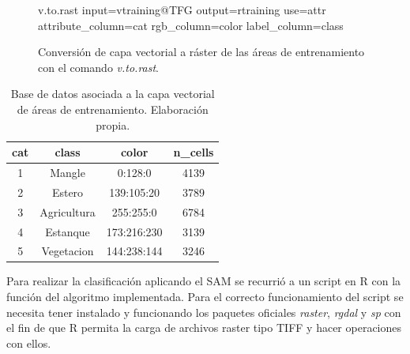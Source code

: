 \begin{figure}
	\centering
	\begin{boxedverbatim}
	v.to.rast input=vtraining@TFG output=rtraining
	use=attr attribute_column=cat
	rgb_column=color label_column=class
	\end{boxedverbatim}
	\caption[Conversión vectorial a ráster]{Conversión de capa vectorial a ráster de las áreas de entrenamiento con el comando \textit{v.to.rast}.}
	\label{fig:conversion}
\end{figure}

\begin{table}[ht]
	\centering
	\begin{tabular}{@{}cccc@{}}
	\toprule[0.4mm]
	cat & class & color & n\_cells\\
	\midrule
	1 & Mangle & 0:128:0 & 4139\\
	2 & Estero & 139:105:20 & 3789\\
	3 & Agricultura & 255:255:0 & 6784\\
	4 & Estanque & 173:216:230 & 3139\\
	5 & Vegetacion & 144:238:144 & 3246\\
	\bottomrule[0.4mm]
	\end{tabular}
	\caption[Base de datos de áreas de entrenamiento]{Base de datos asociada a la capa vectorial de áreas de entrenamiento. Elaboración propia.}
	\label{tab:tabla_training}
\end{table}

Para realizar la clasificación aplicando el \ac{SAM} se recurrió a un script en R con la función del algoritmo implementada. Para el correcto funcionamiento del script se necesita tener instalado y funcionando los paquetes oficiales \textit{raster}, \textit{rgdal} y \textit{sp} con el fin de que R permita la carga de archivos raster tipo \ac{TIFF} y hacer operaciones con ellos.

